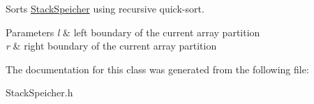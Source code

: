 Sorts \hyperlink{class_stack_speicher}{Stack\+Speicher} using recursive quick-\/sort. 


\begin{DoxyParams}{Parameters}
{\em l} & left boundary of the current array partition \\
\hline
{\em r} & right boundary of the current array partition \\
\hline
\end{DoxyParams}


The documentation for this class was generated from the following file\+:\begin{DoxyCompactItemize}
\item 
Stack\+Speicher.\+h\end{DoxyCompactItemize}
